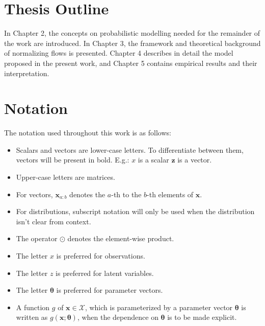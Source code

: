 \section{Thesis Outline}
\label{section:outline}

In Chapter 2, the concepts on probabilistic modelling needed for the remainder
of the work are introduced. In Chapter 3, the framework and theoretical background
of normalizing flows is presented. Chapter 4 describes in detail the model
proposed in the present work, and Chapter 5 contains empirical results and their
interpretation.

\section{Notation}
\label{section:notation}
The notation used throughout this work is as follows:

\begin{itemize}
    \item Scalars and vectors are lower-case letters. To differentiate between
them, vectors will be present in bold. E.g.: $x$ is a scalar $\mathbf{z}$ is
a vector.
    \item Upper-case letters are matrices.
    \item For vectors, $\bm{x}_{a:b}$ denotes the $a$-th to the $b$-th elements
    of $\bm{x}$.
    \item For distributions, subscript notation will only be used when the
distribution isn't clear from context.
    \item The operator $\odot$ denotes the element-wise product.
    \item The letter $x$ is preferred for observations.
    \item The letter $z$ is preferred for latent variables.
    \item The letter $\bm\theta$ is preferred for parameter vectors.
    \item A function $g$ of $\bm{x} \in \bm{\mathcal{X}}$, which is parameterized
    by a parameter vector $\bm\theta$ is written as $g(\bm{x};\bm\theta)$, when
    the dependence on $\bm\theta$ is to be made explicit.
\end{itemize}

